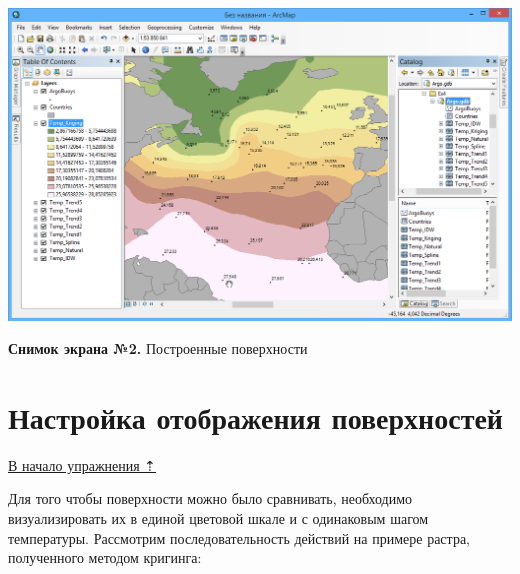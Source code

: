 \documentclass[]{book}
\theoremstyle{definition}
\theoremstyle{definition}
\theoremstyle{definition}
\theoremstyle{remark}
\begin{document}
\includegraphics{images/Ex17/image9.png}

\textbf{Снимок экрана №2.} Построенные поверхности

\hypertarget{interpolation-visualization}{%
\section{Настройка отображения
поверхностей}\label{interpolation-visualization}}

\protect\hyperlink{interpolation}{В начало упражнения ⇡}

Для того чтобы поверхности можно было сравнивать, необходимо
визуализировать их в единой цветовой шкале и с одинаковым шагом
температуры. Рассмотрим последовательность действий на примере растра,
полученного методом кригинга:
\end{document}
